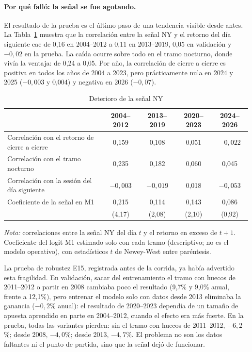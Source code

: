 \documentclass[11pt,a4paper]{article}
\begin{document}
\paragraph{Por qué falló: la señal se fue agotando.} El resultado de la prueba es el último paso de una tendencia visible desde antes. La Tabla~\ref{tab:deterioro} muestra que la correlación entre la señal NY y el retorno del día siguiente cae de 0,16 en 2004--2012 a 0,11 en 2013--2019, 0,05 en validación y $-0{,}02$ en la prueba. La caída ocurre sobre todo en el tramo nocturno, donde vivía la ventaja: de 0,24 a 0,05. Por año, la correlación de cierre a cierre es positiva en todos los años de 2004 a 2023, pero prácticamente nula en 2024 y 2025 ($-0{,}003$ y 0,004) y negativa en 2026 ($-0{,}07$).

\begin{table}[htbp]\centering\small
\caption{Deterioro de la señal NY}\label{tab:deterioro}
\begin{threeparttable}
\begin{tabular}{l cccc}
\toprule
 & 2004--2012 & 2013--2019 & 2020--2023 & 2024--2026 \\
\midrule
Correlación con el retorno de cierre a cierre & 0,159 & 0,108 & 0,051 & $-0{,}022$ \\
Correlación con el tramo nocturno & 0,235 & 0,182 & 0,060 & 0,045 \\
Correlación con la sesión del día siguiente & $-0{,}003$ & $-0{,}019$ & 0,018 & $-0{,}053$ \\
Coeficiente de la señal en M1 & 0,215 & 0,114 & 0,143 & 0,086 \\
 & (4,17) & (2,08) & (2,10) & (0,92) \\
\bottomrule
\end{tabular}
\begin{tablenotes}\footnotesize
\item \emph{Nota:} correlaciones entre la señal NY del día \(t\) y el retorno en exceso de \(t+1\). Coeficiente del logit M1 estimado solo con cada tramo (descriptivo; no es el modelo operativo), con estadísticos \(t\) de Newey-West entre paréntesis.
\end{tablenotes}
\end{threeparttable}
\end{table}

La prueba de robustez E15, registrada antes de la corrida, ya había advertido esta fragilidad. En validación, sacar del entrenamiento el tramo con huecos de 2011--2012 o partir en 2008 cambiaba poco el resultado (9,7\% y 9,0\% anual, frente a 12,1\%), pero entrenar el modelo solo con datos desde 2013 eliminaba la ganancia ($-0{,}2$\% anual): el resultado de 2020--2023 dependía de un tamaño de apuesta aprendido en parte en 2004--2012, cuando el efecto era más fuerte. En la prueba, todas las variantes pierden: sin el tramo con huecos de 2011--2012, $-6{,}2$\%; desde 2008, $-4{,}0$\%; desde 2013, $-4{,}7$\%. El problema no son los datos faltantes ni el punto de partida, sino que la señal dejó de funcionar.
\end{document}
